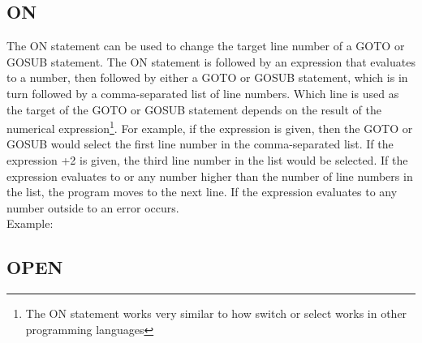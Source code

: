 \vspace{16pt}

\subsection{ON}

The {\ttfamily ON} statement can be used to change the target line number of a
{\ttfamily GOTO} or {\ttfamily GOSUB} statement.  The {\ttfamily ON} statement
is followed by an expression that evaluates to a number, then followed by
either a {\ttfamily GOTO} or {\ttfamily GOSUB} statement, which is in turn
followed by a comma-separated list of line numbers.  Which line is used as the
target of the {\ttfamily GOTO} or {\ttfamily GOSUB} statement depends on the
result of the numerical expression\footnote{The {\ttfamily ON} statement works
very similar to how {\ttfamily switch} or {\ttfamily select} works in other
programming languages}.  For example, if the expression {} is given,
then the {\ttfamily GOTO} or {\ttfamily GOSUB} would select the first line
number in the comma-separated list.  If the expression {+2} is
given, the third line number in the list would be selected.  If the expression
evaluates to {} or any number higher than the number of line numbers
in the list, the program moves to the next line.  If the expression evaluates
to any number outside {} to {} an error occurs.\\

Example:\\



\subsection{OPEN}

